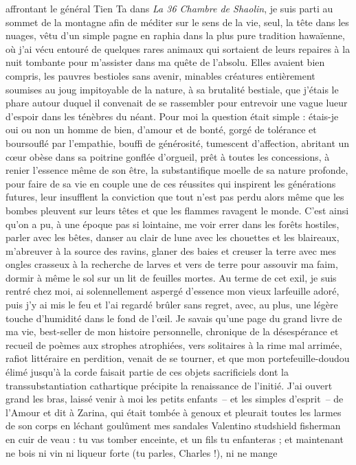  affrontant le général Tien Ta dans \textit{La 36 Chambre de Shaolin}, je suis parti au sommet de la montagne afin de méditer sur le sens de la vie, seul, la tête dans les nuages, vêtu d’un simple pagne en raphia dans la plus pure tradition hawaïenne, où j’ai vécu entouré de quelques rares animaux qui sortaient de leurs repaires à la nuit tombante pour m’assister dans ma quête de l’absolu. Elles avaient bien compris, les pauvres bestioles sans avenir, minables créatures entièrement soumises au joug impitoyable de la nature, à sa brutalité bestiale, que j’étais le phare autour duquel il convenait de se rassembler pour entrevoir une vague lueur d’espoir dans les ténèbres du néant. Pour moi la question était simple : étais-je oui ou non un homme de bien, d’amour et de bonté, gorgé de tolérance et boursouflé par l’empathie, bouffi de générosité, tumescent d’affection, abritant un cœur obèse dans sa poitrine gonflée d’orgueil, prêt à toutes les concessions, à renier l’essence même de son être, la substantifique moelle de sa nature profonde, pour faire de sa vie en couple une de ces réussites qui inspirent les générations futures, leur insufflent la conviction que tout n’est pas perdu alors même que les bombes pleuvent sur leurs têtes et que les flammes ravagent le monde. C’est ainsi qu’on a pu, à une époque pas si lointaine, me voir errer dans les forêts hostiles, parler avec les bêtes, danser au clair de lune avec les chouettes et les blaireaux, m’abreuver à la source des ravins, glaner des baies et creuser la terre avec mes ongles crasseux à la recherche de larves et vers de terre pour assouvir ma faim, dormir à même le sol sur un lit de feuilles mortes. Au terme de cet exil, je suis rentré chez moi, ai solennellement aspergé d’essence mon vieux larfeuille adoré, puis j’y ai mis le feu et l’ai regardé brûler sans regret, avec, au plus, une légère touche d’humidité dans le fond de l’œil. Je savais qu’une page du grand livre de ma vie, best-seller de mon histoire personnelle, chronique de la désespérance et recueil de poèmes aux strophes atrophiées, vers solitaires à la rime mal arrimée, rafiot littéraire en perdition, venait de se tourner, et que mon portefeuille-doudou élimé jusqu’à la corde faisait partie de ces objets sacrificiels dont la transsubstantiation cathartique précipite la renaissance de l’initié. J’ai ouvert grand les bras, laissé venir à moi les petits enfants~-- et les simples d’esprit~-- de l’Amour et dit à Zarina, qui était tombée à genoux et pleurait toutes les larmes de son corps en léchant goulûment mes sandales Valentino studshield fisherman en cuir de veau : tu vas tomber enceinte, et un fils tu enfanteras ; et maintenant ne bois ni vin ni liqueur forte (tu parles, Charles !), ni ne mange 